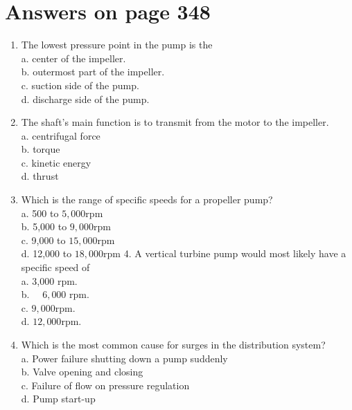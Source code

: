 \documentclass[10pt]{article}
\begin{document}
\section{Answers on page 348}
\begin{enumerate}
  \item The lowest pressure point in the pump is the\\
a. center of the impeller.\\
b. outermost part of the impeller.\\
c. suction side of the pump.\\
d. discharge side of the pump.

  \item The shaft's main function is to transmit from the motor to the impeller.\\
a. centrifugal force\\
b. torque\\
c. kinetic energy\\
d. thrust

  \item Which is the range of specific speeds for a propeller pump?\\
a. 500 to $5,000 \mathrm{rpm}$\\
b. 5,000 to $9,000 \mathrm{rpm}$\\
c. 9,000 to $15,000 \mathrm{rpm}$\\
d. 12,000 to $18,000 \mathrm{rpm}$ 4. A vertical turbine pump would most likely have a specific speed of\\
a. 3,000 rpm.\\
b. $\quad 6,000$ rpm.\\
c. $9,000 \mathrm{rpm}$.\\
d. $12,000 \mathrm{rpm}$.

  \item Which is the most common cause for surges in the distribution system?\\
a. Power failure shutting down a pump suddenly\\
b. Valve opening and closing\\
c. Failure of flow on pressure regulation\\
d. Pump start-up

\end{enumerate}
\end{document}
